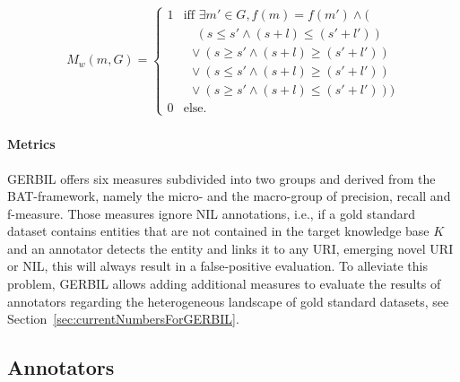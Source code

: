 \begin{align}
M_w (m,G)=
\begin{cases}
1 &  \text{iff }\exists m' \in G, f(m) = f(m')  \land (\\
 &\ \ \ \,\, ( s \leq s' \land (s+l) \leq (s'+l') )\\ %
 &\ \ \lor ( s \geq s' \land (s+l) \geq (s'+l') )\\ %
 &\ \ \lor ( s \leq s' \land (s+l) \geq (s'+l') )\\ %
 &\ \ \lor ( s \geq s' \land (s+l) \leq (s'+l') ))\\ %
0 & \text{else.}
\end{cases}
\end{align}


\paragraph{Metrics}
GERBIL offers six measures subdivided into two groups and derived from the BAT-framework, namely the micro- and the macro-group of precision, recall and f-measure.
Those measures ignore NIL annotations, i.e., if a gold standard dataset contains entities that are not contained in the target knowledge base $K$ and an annotator detects the entity and links it to any URI, emerging novel URI or NIL, this will always result in a false-positive evaluation. 
To alleviate this problem, GERBIL allows adding additional measures to evaluate the results of annotators regarding the heterogeneous landscape of gold standard datasets, see Section~\ref{sec:currentNumbersForGERBIL}.

\subsection{Annotators}
\label{sec:annotators}

